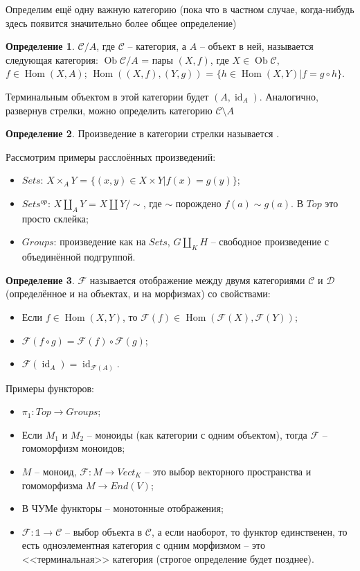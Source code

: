 \documentclass[a4paper]{article}
\theoremstyle{indented}
\theoremstyle{definition}
\newtheorem{defn}{Определение}
\theoremstyle{remark}
\DeclareMathOperator{\id}{id}
\DeclareMathOperator{\Ob}{Ob}
\DeclareMathOperator{\Hom}{Hom}
\begin{document}
Определим ещё одну важную категорию (пока что в частном случае, когда-нибудь здесь появится значительно более общее определение)
\begin{defn}
     $\mathcal{C}/A$, где $\mathcal{C}$ -- категория, а $A$ -- объект в ней, называется следующая категория: $\Ob\mathcal{C}/A$ = пары $(X, f)$, где $X\in \Ob\mathcal{C}$, $f\in \Hom (X, A)$; $\Hom ((X, f), (Y, g))$ = $\lbrace h\in \Hom (X, Y) \vert f = g\circ  h \rbrace$. 
\end{defn}
Терминальным объектом в этой категории будет $(A, \id_{A})$. Аналогично, развернув стрелки, можно определить категорию $\mathcal{C}\setminus A$
\begin{defn}
    Произведение в категории стрелки называется .
\end{defn}
Рассмотрим примеры расслоённых произведений: 
\begin{itemize}
    \item $Sets$: $X\times _{A} Y$ = $\lbrace(x, y) \in X\times Y\vert f(x)=g(y)\rbrace$;
    \item $Sets^{op}$: $X\amalg _{A} Y$ = $X\amalg Y / \sim$, где $\sim$ порождено $f(a) \sim g(a)$. В $Top$ это просто склейка;
    \item $Groups$: произведение как на $Sets$, $G\amalg _{K} H$ -- свободное произведение с объединённой подгруппой.
\end{itemize}
\begin{defn}
 $\mathcal{F}$ называется отображение между двумя категориями $\mathcal{C}$ и $\mathcal{D}$ (определённое и на объектах, и на морфизмах) со свойствами: 
    \begin{itemize}
        \item Если $f\in \Hom (X, Y)$, то $\mathcal{F} (f)\in \Hom (\mathcal{F}(X), \mathcal{F}(Y))$;
        \item $\mathcal{F}(f\circ  g) = \mathcal{F}(f) \circ  \mathcal{F}(g)$;
        \item $\mathcal{F}(\id_{A}) = \id_{\mathcal{F}(A)}$.
    \end{itemize}
\end{defn} 
Примеры функторов: 
\begin{itemize}
    \item $\pi _{1}: Top \rightarrow Groups$;
    \item Если $M_{1}$ и $M_{2}$ -- моноиды (как категории с одним объектом), тогда $\mathcal{F}$ -- гомоморфизм моноидов;
    \item $M$ -- моноид, $\mathcal{F}: M\rightarrow Vect_{K}$ -- это выбор векторного пространства и гомоморфизма $M \rightarrow End(V)$;
    \item В ЧУМе функторы -- монотонные отображения;
    \item $\mathcal{F}: \mathbb{1} \rightarrow \mathcal{C}$ -- выбор объекта в $\mathcal{C}$, а если наоборот, то функтор единственен, то есть одноэлементная категория с одним морфизмом -- это <<терминальная>> категория (строгое определение будет позднее).
\end{itemize}
\end{document}
